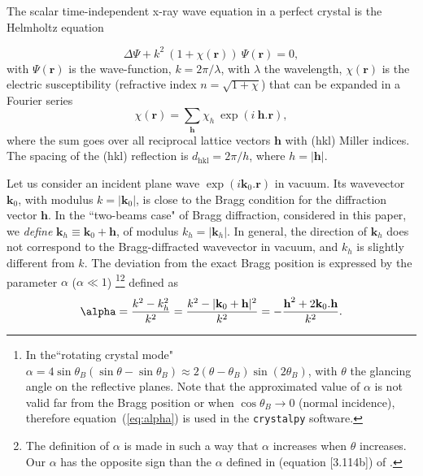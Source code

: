 \documentclass[preprint]{iucr}              %
\begin{document}
The scalar time-independent x-ray wave equation in a perfect crystal is the Helmholtz equation

\begin{equation}
\label{eq:helmholz}
    \Delta \Psi + k^2~(1+\chi(\textbf{r})) ~\Psi(\textbf{r}) = 0,
\end{equation}
with $\Psi(\textbf{r})$ is the wave-function, $k=2\pi/\lambda$, with $\lambda$ the wavelength, $\chi(\textbf{r})$ is the electric susceptibility (refractive index $n=\sqrt{1+\chi}$)
that can be expanded in a Fourier series
\begin{equation}
\label{eq:chi}
    \chi(\textbf{r}) = \sum_{\textbf{h}} \chi_h ~\exp(i~\textbf{h} . \textbf{r}),
\end{equation}
where 
the sum goes over all reciprocal lattice vectors $\textbf{h}$ with (hkl) Miller indices. 
The spacing of the (hkl) reflection is $d_\text{hkl}=2 \pi/h$, where $h=|\textbf{h}|$.

Let us consider an incident plane wave $\exp(i\textbf{k}_0 . \textbf{r})$ in vacuum. Its wavevector $\textbf{k}_0$, with modulus $k=|\textbf{k}_0|$, is close to the Bragg condition for the diffraction vector $\textbf{h}$.
In the ``two-beams case" of Bragg diffraction, considered in this paper, we \textit{define} $\textbf{k}_h \equiv \textbf{k}_0+\textbf{h}$, of modulus  $k_h=|\textbf{k}_h|$.
In general, the direction of $\textbf{k}_h$ does not correspond to the Bragg-diffracted wavevector in vacuum, and $k_h$ is slightly different from $k$.
The deviation from the exact Bragg position is expressed by the parameter $\alpha$ ($\alpha \ll 1$)
 \footnote{In the``rotating crystal mode" $\alpha=4 \sin \theta_B (\sin \theta - \sin \theta_B) \approx 2 (\theta-\theta_B) \sin (2\theta_B)$, with $\theta$ the glancing angle on the reflective planes. Note that the approximated value of $\alpha$ is not valid far from the Bragg position or when $\cos\theta_B \rightarrow 0$ (normal incidence), therefore  equation~(\ref{eq:alpha}) is used in the {\tt crystalpy} software. }\footnote{
 The definition of $\alpha$ is made in such a way that $\alpha$ increases when $\theta$ increases. Our $\alpha$ has the opposite sign than the $\alpha$ defined in (equation [3.114b]) of \cite{ZachariasenBook}. 
 } defined as
\begin{equation}
\label{eq:alpha}
\alpha = \frac{k^2-k_h^2}{k^2} = \frac{k^2-|\textbf k_0 + \textbf h|^2}{k^2} = - \frac{\textbf h^2 + 2 \textbf k_0 . \textbf h}{k^2}.
\end{equation}
\end{document}
